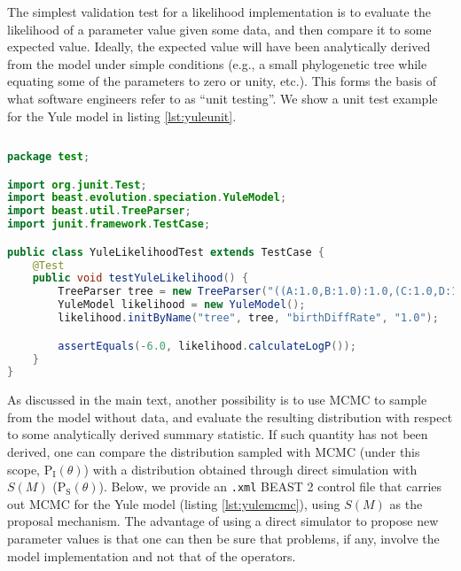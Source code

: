 \documentclass[oneside]{article}
\begin{document}
The simplest validation test for a likelihood implementation is to
evaluate the likelihood of a parameter value given some
data, and then compare it to some expected value.
Ideally, the expected value will have been analytically derived from the
model under simple conditions (e.g., a small phylogenetic tree while
equating some of the parameters to zero or unity, etc.).
This forms the basis of what software engineers refer to as ``unit testing''.
We show a unit test example for the Yule model in listing \ref{lst:yuleunit}.

{\small
\vspace{2cm}
\singlespacing
\begin{lstlisting}[language=Java, caption=Java unit test for Yule model
  likelihood function given a small phylogenetic tree.,label={lst:yuleunit}]
  
package test;

import org.junit.Test;
import beast.evolution.speciation.YuleModel;
import beast.util.TreeParser;
import junit.framework.TestCase;

public class YuleLikelihoodTest extends TestCase {
    @Test
    public void testYuleLikelihood() {
        TreeParser tree = new TreeParser("((A:1.0,B:1.0):1.0,(C:1.0,D:1.0):1.0);");
        YuleModel likelihood = new YuleModel();
        likelihood.initByName("tree", tree, "birthDiffRate", "1.0");

        assertEquals(-6.0, likelihood.calculateLogP());
    }
}
\end{lstlisting}
}

As discussed in the main text, another possibility is to use MCMC to
sample from the model without data, and evaluate the resulting
distribution with respect to some analytically derived summary
statistic.
If such quantity has not been derived, one can compare the
distribution sampled with MCMC (under this scope,
$\text{P}_{\text{I}}(\theta)$) with a distribution obtained through 
direct simulation with $S(M)$ ($\text{P}_{\text{S}}(\theta)$).
Below, we provide an \texttt{.xml} BEAST 2 control file that carries
out MCMC for the Yule model (listing
\ref{lst:yulemcmc}), using $S(M)$ as the proposal
mechanism.
The advantage of using a direct simulator to propose new parameter values is
that one can then be sure that problems, if any, involve the model
implementation and not that of the operators. 
\end{document}
